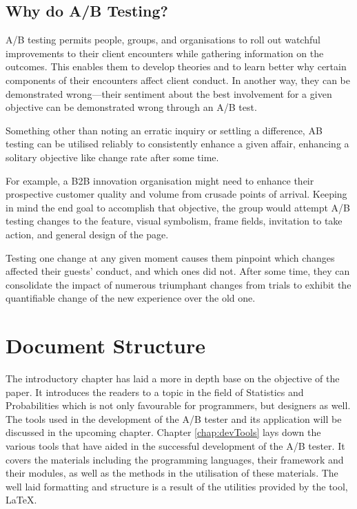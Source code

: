 \subsection{Why do A/B Testing?}
A/B testing permits people, groups, and organisations to roll out watchful improvements to their client encounters while gathering information on the outcomes. This enables them to develop theories and to learn better why certain components of their encounters affect client conduct. In another way, they can be demonstrated wrong—their sentiment about the best involvement for a given objective can be demonstrated wrong through an A/B test.\par

Something other than noting an erratic inquiry or settling a difference, AB testing can be utilised reliably to consistently enhance a given affair, enhancing a solitary objective like change rate after some time.\par

For example, a B2B innovation organisation might need to enhance their prospective customer quality and volume from crusade points of arrival. Keeping in mind the end goal to accomplish that objective, the group would attempt A/B testing changes to the feature, visual symbolism, frame fields, invitation to take action, and general design of the page.\par

Testing one change at any given moment causes them pinpoint which changes affected their guests' conduct, and which ones did not. After some time, they can consolidate the impact of numerous triumphant changes from trials to exhibit the quantifiable change of the new experience over the old one.\par

\section{Document Structure}
The introductory chapter has laid a more in depth base on the objective of the paper. It introduces the readers to a topic in the field of Statistics and Probabilities which is not only favourable for programmers, but designers as well. The tools used in the development of the A/B tester and its application will be discussed in the upcoming chapter.
Chapter \ref{chap:devTools} lays down the various tools that have aided in the successful development of the A/B tester. It covers the materials including the programming languages, their framework and their modules, as well as the methods in the utilisation of these materials.
The well laid formatting and structure is a result of the utilities provided by the tool, \LaTeX. 